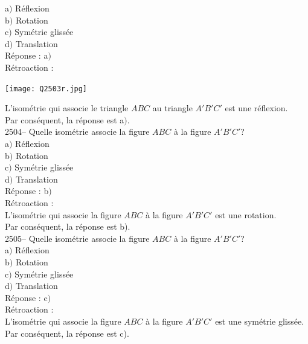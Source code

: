 \documentclass[letterpaper, 12pt]{article}
\begin{document}
a$)$  R\'eflexion \\
b$)$  Rotation\\
c$)$  Sym\'etrie gliss\'ee\\
d$)$  Translation \\

R\'eponse : a$)$\\

R\'etroaction :\\
\begin{center}
 \texttt{[image: Q2503r.jpg]}
\end{center}
L'isom\'etrie qui associe le triangle $ABC$ au triangle $A'B'C'$ est une r\'eflexion.\\
Par cons\'equent, la r\'eponse est a$)$.\\


2504-- Quelle isom\'etrie associe la figure $ABC$ \`a la figure $A'B'C'$?\\

a$)$  R\'eflexion \\
b$)$  Rotation\\
c$)$  Sym\'etrie gliss\'ee\\
d$)$  Translation \\

R\'eponse : b$)$\\

R\'etroaction :\\
L'isom\'etrie qui associe la figure $ABC$ \`a la figure $A'B'C'$ est une rotation.\\
Par cons\'equent, la r\'eponse est b).\\

2505--   Quelle isom\'etrie associe la figure $ABC$ \`a la figure $A'B'C'$?\\

a$)$  R\'eflexion \\
b$)$  Rotation\\
c$)$  Sym\'etrie gliss\'ee\\
d$)$  Translation \\

R\'eponse : c$)$\\

R\'etroaction :\\
L'isom\'etrie qui associe la figure $ABC$ \`a la figure $A'B'C'$ est une sym\'etrie gliss\'ee.\\
Par cons\'equent, la r\'eponse est c).\\
\end{document}
